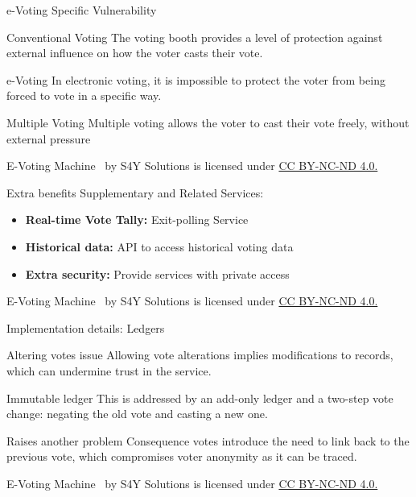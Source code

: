 \documentclass[12pt]{beamer}
\newcommand{\currentyear}{\the\year} %
\newcommand{\copyrightnote}{
    \vfill
    \begin{flushleft}
    \tiny
    E-Voting Machine \textcopyright \currentyear~by S4Y Solutions is licensed under \href{https://creativecommons.org/licenses/by-nc-nd/4.0}{CC BY-NC-ND 4.0.}
    \end{flushleft}
}
\begin{document}
    \begin{frame}[allowframebreaks]{e-Voting Specific Vulnerability}
        \vfill
        \begin{block}{Conventional Voting}
            The voting booth provides a level of protection against external influence on how the voter casts their vote.
        \end{block}

        \begin{alertblock}{e-Voting}
            In electronic voting, it is impossible to protect the voter from being forced to vote in a specific way.
        \end{alertblock}

        \begin{exampleblock}{Multiple Voting}
            Multiple voting allows the voter to cast their vote freely, without external pressure
        \end{exampleblock}

        \copyrightnote
    \end{frame}

    \begin{frame}[allowframebreaks]{Extra benefits}
        \vfill
        Supplementary and Related Services:
        \begin{itemize}
            \item \textbf{Real-time Vote Tally:} Exit-polling Service
            \item \textbf{Historical data:} API to access historical voting data
            \item \textbf{Extra security:} Provide services with private access
        \end{itemize}
        \copyrightnote
    \end{frame}

    \begin{frame}[allowframebreaks]{Implementation details: Ledgers}
        \vfill
        \begin{block}{Altering votes issue}
            Allowing vote alterations implies modifications to records, which can undermine trust
            in the service.
        \end{block}

        \begin{exampleblock}{Immutable ledger}
            This is addressed by an add-only ledger and a two-step vote change: negating the old
            vote and casting a new one.
        \end{exampleblock}

        \begin{alertblock}{Raises another problem}
            Consequence votes introduce the need to link back to the previous vote, which compromises
            voter anonymity as it can be traced.
        \end{alertblock}

        \copyrightnote
    \end{frame}
\end{document}
